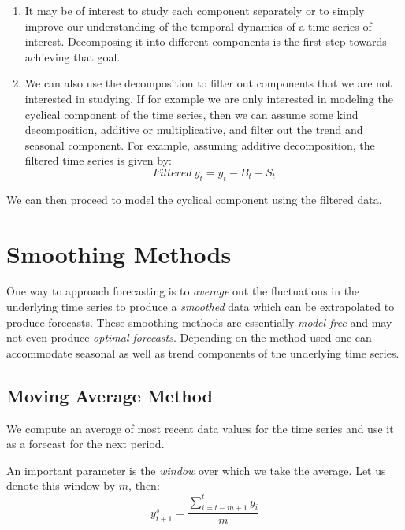 \documentclass[]{book}
\theoremstyle{definition}
\theoremstyle{definition}
\theoremstyle{definition}
\theoremstyle{remark}
\begin{document}
\begin{enumerate}
\def\labelenumi{\arabic{enumi}.}
\item
  It may be of interest to study each component separately or to simply
  improve our understanding of the temporal dynamics of a time series of
  interest. Decomposing it into different components is the first step
  towards achieving that goal.
\item
  We can also use the decomposition to filter out components that we are
  not interested in studying. If for example we are only interested in
  modeling the cyclical component of the time series, then we can assume
  some kind decomposition, additive or multiplicative, and filter out
  the trend and seasonal component. For example, assuming additive
  decomposition, the filtered time series is given by: \begin{equation}
  Filtered \ y_t= y_t-B_t-S_t
  \end{equation}
\end{enumerate}

We can then proceed to model the cyclical component using the filtered
data.

\hypertarget{smoothing-methods}{%
\chapter{Smoothing Methods}\label{smoothing-methods}}

One way to approach forecasting is to \emph{average} out the
fluctuations in the underlying time series to produce a \emph{smoothed}
data which can be extrapolated to produce forecasts. These smoothing
methods are essentially \emph{model-free} and may not even produce
\emph{optimal forecasts}. Depending on the method used one can
accommodate seasonal as well as trend components of the underlying time
series.

\hypertarget{moving-average-method}{%
\section{Moving Average Method}\label{moving-average-method}}

We compute an average of most recent data values for the time series and
use it as a forecast for the next period.

An important parameter is the \emph{window} over which we take the
average. Let us denote this window by \(m\), then: \begin{equation}
    y^s_{t+1}=\frac{\sum \limits_{i=t-m+1}^{t}{y_i}}{m}
    \end{equation}
\end{document}
